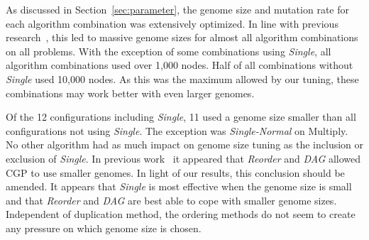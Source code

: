 \documentclass[journal]{IEEEtran}
\begin{document}
As discussed in Section~\ref{sec:parameter}, the genome size and mutation rate
for each algorithm combination was extensively optimized.  In line with previous
research~\cite{miller:2006:redundancy}, this led to massive genome sizes for
almost all algorithm combinations on all problems.  With the exception of 
some combinations using \emph{Single}, all algorithm combinations used over
1,000 nodes.  Half of all combinations without \emph{Single} used 10,000 nodes.
As this was the maximum allowed by our tuning, these combinations may work better with even larger
genomes.

Of the 12 configurations including \emph{Single}, 11 used a genome size smaller
than all configurations not using \emph{Single}.  The exception was \emph{Single-Normal}
on Multiply.  No other algorithm had as much impact on genome size tuning as
the inclusion or exclusion of \emph{Single}.  In previous work~\cite{goldman:2013:ordering}
it appeared that \emph{Reorder} and \emph{DAG} allowed CGP to use smaller genomes.
In light of our results, this conclusion should be amended.
It appears that \emph{Single} is most effective when the genome size is small and
that \emph{Reorder} and \emph{DAG} are best able to cope with smaller genome sizes.
Independent of duplication method, the ordering methods do not seem to create any
pressure on which genome size is chosen.

\begin{comment}
Genome size explosion seems most prevalent on easier problems, with Parity and
Encode having much higher genome sizes than Decode and Multiply.  Initially
this seems counter intuitive, as we would expect harder problems to require
larger solutions which in turn should require larger genomes.  Yet the genome
sizes in use are so far beyond what a solution to these problems require that
solution size is likely not the cause of this behavior.  Instead, consider
the usefulness of unexplored nodes.

On simple enough problems, exploring lots of randomly generated nodes may be
sufficient to generate high quality solutions.  At relatively low numbers of
evaluations, large genotypes likely mean each mutation to a connection gene
will activate nodes that have never been active, resulting in exploration.
At higher numbers of evaluations, mutations to connection genes that are not currently
active have a high chance of connecting to a node that was tested previously
and found ineffective.  As a result, having a smaller genome size on harder problems
may reduce the chance of exploratory mutations when optimizing near the global optimum.

Under this theory, we should expect Parity to have the largest genome sizes
\end{comment}
\end{document}
